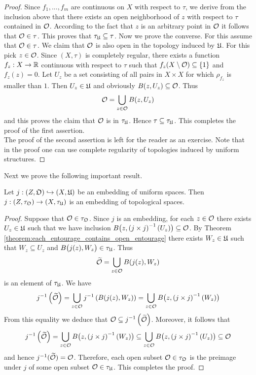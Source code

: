 \begin{proof}
Since $f_1,...,f_m$ are continuous on $X$ with respect to $\tau$, we derive from the inclusion above that there exists an open neighborhood of $z$ with respect to $\tau$ contained in ${\mathcal O}$. According to the fact that $z$ is an arbitrary point in ${\mathcal O}$ it follows that ${\mathcal O} \in \tau$. This proves that $\tau_{{\mathfrak U}}\subseteq \tau$. Now we prove the converse. For this assume that ${\mathcal O} \in \tau$. We claim that ${\mathcal O}$ is also open in the topology induced by ${\mathfrak U}$. For this pick $z \in {\mathcal O}$. Since $(X,\tau)$ is completely regular, there exists a function $f_z:X\rightarrow {\mathbb R}$ continuous with respect to $\tau$ such that $f_z(X\setminus {\mathcal O})\subseteq \{1\}$ and $f_z(z) = 0$. Let $U_z$ be a set consisting of all pairs in $X\times X$ for which $\rho_{f_z}$ is smaller than $1$. Then $U_z\in {\mathfrak U}$ and obviously $B(z,U_z)\subseteq {\mathcal O}$. Thus
$${\mathcal O} = \bigcup_{z\in {\mathcal O}}B(z,U_z)$$
and this proves the claim that ${\mathcal O}$ is in $\tau_{{\mathfrak U}}$. Hence $\tau \subseteq \tau_{{\mathfrak U}}$. This completes the proof of the first assertion.\\
The proof of the second assertion is left for the reader as an exercise. Note that in the proof one can use complete regularity of topologies induced by uniform structures.   
\end{proof}
\noindent
Next we prove the following important result.

\begin{proposition}\label{proposition:the_induced_topology_preserves_uniform_subspaces}
Let $j:(Z,{\mathfrak O})\hookrightarrow \left(X,{\mathfrak U}\right)$ be an embedding of uniform spaces. Then $j:\left(Z,\tau_{{\mathfrak O}}\right)\rightarrow \left(X,\tau_{{\mathfrak U}}\right)$ is an embedding of topological spaces.
\end{proposition}
\begin{proof}
Suppose that ${\mathcal O} \in \tau_{{\mathfrak O}}$. Since $j$ is an embedding, for each $z\in {\mathcal O}$ there exists $U_z \in {\mathfrak U}$ such that we have inclusion $B\big(z,\left(j\times j\right)^{-1}(U_z)\big)\subseteq {\mathcal O}$. By Theorem \ref{theorem:each_entourage_contains_open_entourage} there exists $W_z\in {\mathfrak U}$ such that $W_z\subseteq U_z$ and $B\big(j(z),W_z\big) \in \tau_{{\mathfrak U}}$. Thus 
$$\widetilde{{\mathcal O}} = \bigcup_{z \in {\mathcal O}}B(j(z),W_z)$$
is an element of $\tau_{{\mathfrak U}}$. We have
$$j^{-1}\left(\widetilde{{\mathcal O}}\right) = \bigcup_{z \in {\mathcal O}}j^{-1}\left(B(j(z),W_z)\right) = \bigcup_{z\in {\mathcal O}}B\big(z,\left(j\times j\right)^{-1}(W_z)\big)$$
From this equality we deduce that ${\mathcal O} \subseteq j^{-1}\left(\widetilde{{\mathcal O}}\right)$. Moreover, it follows that
$$j^{-1}\left(\widetilde{{\mathcal O}}\right) = \bigcup_{z\in {\mathcal O}}B\big(z,\left(j\times j\right)^{-1}(W_z)\big) \subseteq \bigcup_{z\in {\mathcal O}}B\big(z,\left(j\times j\right)^{-1}(U_z)\big)\subseteq {\mathcal O}$$
and hence $j^{-1}(\widetilde{{\mathcal O}}) = {\mathcal O}$. Therefore, each open subset ${\mathcal O} \in \tau_{{\mathfrak O}}$ is the preimage under $j$ of some open subset ${\mathcal O} \in \tau_{{\mathfrak U}}$. This completes the proof.
\end{proof}

